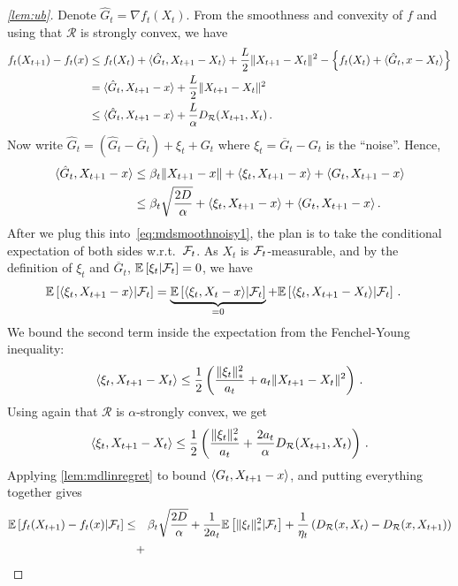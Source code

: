 \begin{proof}[\cref{lem:ub}]
Denote $\hat{G}_t = \nabla f_t(X_t)$.
From the smoothness and convexity of $f$ and using that $\mathcal{R}$ is strongly convex, we have
\begin{align}
f_t(X_{t+1}) - f_t(x)
 &\le f_t(X_t) + \langle  \hat{G}_t, X_{t+1}-X_t  \rangle + \frac{L}{2} \|X_{t+1}-X_t\|^2 - \left\{ f_t(X_t) + \langle  \hat{G}_t, x-X_t \rangle \right\} \nonumber \\
 &= \langle \hat{G}_t, X_{t+1} - x  \rangle +  \frac{L}{2} \|X_{t+1}-X_t\|^2 \nonumber\\
 &\le \langle \hat{G}_t,X_{t+1}-x \rangle + \frac{L}{\alpha} D_{\mathcal{R}}(X_{t+1},X_t)\,. \label{eq:mdsmoothnoisy1}
\end{align}
Now write
$\hat{G}_t = (\hat{G}_t-\overline G_t)  + \xi_t + G_t$ where $\xi_t = \overline G_t - G_t$ is the ``noise''.
Hence,
\begin{align*}
\langle \hat{G}_t,X_{t+1}-x \rangle
&\le \beta_t \|X_{t+1}-x\| + \langle \xi_t,X_{t+1}-x \rangle + \langle  G_t, X_{t+1} - x  \rangle\\
&\le \beta_t \sqrt{ \frac{2D}{\alpha} } + \langle \xi_t,X_{t+1}-x \rangle + \langle  G_t, X_{t+1} - x  \rangle \,.
\end{align*}
After we plug this into~\eqref{eq:mdsmoothnoisy1},
the plan is to take the conditional expectation of both sides w.r.t.\  $\mathcal{F}_{t}$.
As $X_t$ is $\mathcal{F}_{t}$-measurable, and by the definition of $\xi_t$ and $\overline G_t$, $\mathbb{E}\left[ \xi_t|\mathcal{F}_{t}\right] = 0$,
we have
\begin{align*}
\MoveEqLeft
\EE{\ip{\xi_t, X_{t+1}-x}|\F_{t}} = \underbrace{\EE{\ip{\xi_t,X_{t}-x}|\F_{t}}}_{=0} + \EE{\ip{\xi_t,X_{t+1}-X_t}|\F_{t}} \,.
\end{align*}
We bound the second term inside the expectation from the Fenchel-Young inequality:
\begin{align*}
\langle \xi_t,X_{t+1}-X_t \rangle \le \frac12 \left(\frac{\|\xi_t\|_*^2}{a_t} + a_t \|X_{t+1}-X_t\|^2\right)\,.
\end{align*}
Using again that $\mathcal{R}$ is $\alpha$-strongly convex, we get
\[
\langle \xi_t,X_{t+1}-X_t \rangle \le \frac12 \left(\frac{\|\xi_t\|_*^2}{a_t} + \frac{2a_t}{\alpha} D_{\mathcal{R}}(X_{t+1},X_t) \right)\,.
\]
Applying
\cref{lem:mdlinregret}
to bound $\langle  G_t, X_{t+1} - x  \rangle$, and putting everything together gives
\begin{align*}
 \EE{f_t(X_{t+1}) - f_t(x) |\F_{t} }
\le & \quad
 \beta_t \sqrt{ \frac{2D}{\alpha} }+
\frac{1}{2a_t}  \EE{\norm{\xi_t}_*^2|\F_{t}}+
\frac{1}{\eta_t} \left(D_{\mathcal{R}}(x,X_t)-D_{\mathcal{R}}(x,X_{t+1})\right) \\&+

\end{align*}
\end{proof}
